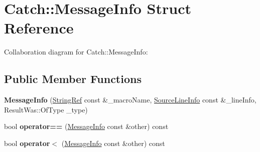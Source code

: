 \hypertarget{structCatch_1_1MessageInfo}{}\section{Catch\+:\+:Message\+Info Struct Reference}
\label{structCatch_1_1MessageInfo}


Collaboration diagram for Catch\+:\+:Message\+Info\+:
\subsection*{Public Member Functions}
\begin{DoxyCompactItemize}
\item 
{\bfseries Message\+Info} (\hyperlink{classCatch_1_1StringRef}{String\+Ref} const \&\+\_\+macro\+Name, \hyperlink{structCatch_1_1SourceLineInfo}{Source\+Line\+Info} const \&\+\_\+line\+Info, Result\+Was\+::\+Of\+Type \+\_\+type)\hypertarget{structCatch_1_1MessageInfo_afac7a84a9e8655428035a3c5418044f0}{}\label{structCatch_1_1MessageInfo_afac7a84a9e8655428035a3c5418044f0}

\item 
bool {\bfseries operator==} (\hyperlink{structCatch_1_1MessageInfo}{Message\+Info} const \&other) const \hypertarget{structCatch_1_1MessageInfo_a30fe117138e568c5a9dfdabb7de6e790}{}\label{structCatch_1_1MessageInfo_a30fe117138e568c5a9dfdabb7de6e790}

\item 
bool {\bfseries operator$<$} (\hyperlink{structCatch_1_1MessageInfo}{Message\+Info} const \&other) const \hypertarget{structCatch_1_1MessageInfo_a7a2b1ec3772cd35176e2ee25a94be16a}{}\label{structCatch_1_1MessageInfo_a7a2b1ec3772cd35176e2ee25a94be16a}

\end{DoxyCompactItemize}
